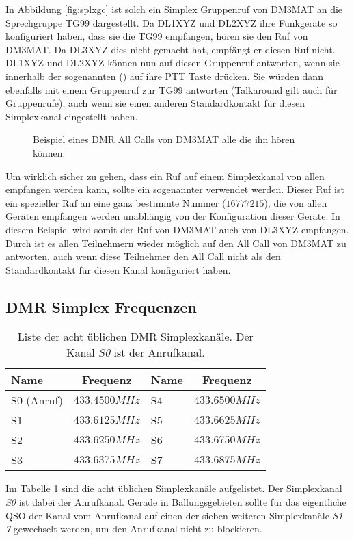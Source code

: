 In Abbildung \ref{fig:splxgc} ist solch ein Simplex Gruppenruf von DM3MAT an die Sprechgruppe TG99 dargestellt. Da DL1XYZ und DL2XYZ ihre Funkgeräte so konfiguriert haben, dass sie die TG99 empfangen, hören sie den Ruf von DM3MAT. Da DL3XYZ dies nicht gemacht hat, empfängt er diesen Ruf nicht. DL1XYZ und DL2XYZ können nun auf diesen Gruppenruf antworten, wenn sie innerhalb der sogenannten  () auf ihre PTT Taste drücken. Sie würden dann ebenfalls mit einem Gruppenruf zur TG99 antworten (Talkaround gilt auch für Gruppenrufe), auch wenn sie einen anderen Standardkontakt für diesen Simplexkanal eingestellt haben.

\begin{figure}[!ht]
  \centering
  
  \caption{Beispiel eines DMR All Calls von DM3MAT alle die ihn hören können.} \label{fig:splxac}
\end{figure}

Um wirklich sicher zu gehen, dass ein Ruf auf einem Simplexkanal von allen empfangen werden kann, sollte ein sogenannter  verwendet werden. Dieser Ruf ist ein spezieller Ruf an eine ganz bestimmte Nummer ($16777215$), die von allen Geräten empfangen werden unabhängig von der Konfiguration dieser Geräte. In diesem Beispiel wird somit der Ruf von DM3MAT auch von DL3XYZ empfangen. Durch  ist es allen Teilnehmern wieder möglich auf den All Call von DM3MAT zu antworten, auch wenn diese Teilnehmer den All Call nicht als den Standardkontakt für diesen Kanal konfiguriert haben. 

\subsection{DMR Simplex Frequenzen}
\begin{table}[!ht]
 \centering
 \begin{tabular}{|l|c||l|c|} \hline
  Name & Frequenz & Name & Frequenz \\ \hline \hline
  S0 (Anruf) & $433.4500 MHz$ & S4 & $433.6500 MHz$ \\
  S1         & $433.6125 MHz$ & S5 & $433.6625 MHz$ \\
  S2         & $433.6250 MHz$ & S6 & $433.6750 MHz$ \\
  S3         & $433.6375 MHz$ & S7 & $433.6875 MHz$ \\ \hline
 \end{tabular}
 \caption{Liste der acht üblichen DMR Simplexkanäle. Der Kanal \emph{S0} ist der Anrufkanal.} \label{tab:simplex}
\end{table}

Im Tabelle \ref{tab:simplex} sind die acht üblichen Simplexkanäle aufgelistet. Der Simplexkanal \emph{S0} ist dabei der Anrufkanal. Gerade in Ballungsgebieten sollte für das eigentliche QSO der Kanal vom Anrufkanal auf einen der sieben weiteren Simplexkanäle \emph{S1-7} gewechselt werden, um den Anrufkanal nicht zu blockieren. 